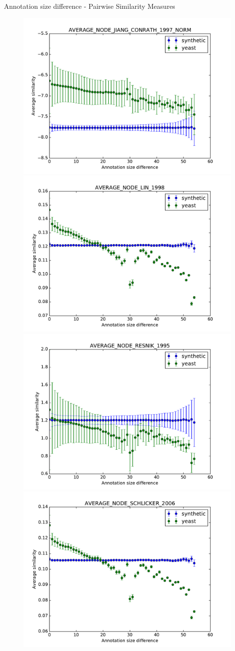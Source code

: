 \documentclass{beamer}
\begin{document}
\begin{frame}{Annotation size difference - Pairwise Similarity Measures}
\begin{figure}
\includegraphics[width=0.5\linewidth, height=0.4\textheight]{pairwise_diff/SIM_GROUPWISE_AVERAGE_SIM_PAIRWISE_DAG_NODE_JIANG_CONRATH_1997_NORM_diff.pdf}
\includegraphics[width=0.5\linewidth, height=0.4\textheight]{pairwise_diff/SIM_GROUPWISE_AVERAGE_SIM_PAIRWISE_DAG_NODE_LIN_1998_diff.pdf} \\
\includegraphics[width=0.5\linewidth, height=0.4\textheight]{pairwise_diff/SIM_GROUPWISE_AVERAGE_SIM_PAIRWISE_DAG_NODE_RESNIK_1995_diff.pdf}
\includegraphics[width=0.5\linewidth, height=0.4\textheight]{pairwise_diff/SIM_GROUPWISE_AVERAGE_SIM_PAIRWISE_DAG_NODE_SCHLICKER_2006_diff.pdf}
\end{figure}
\end{frame}
\end{document}

